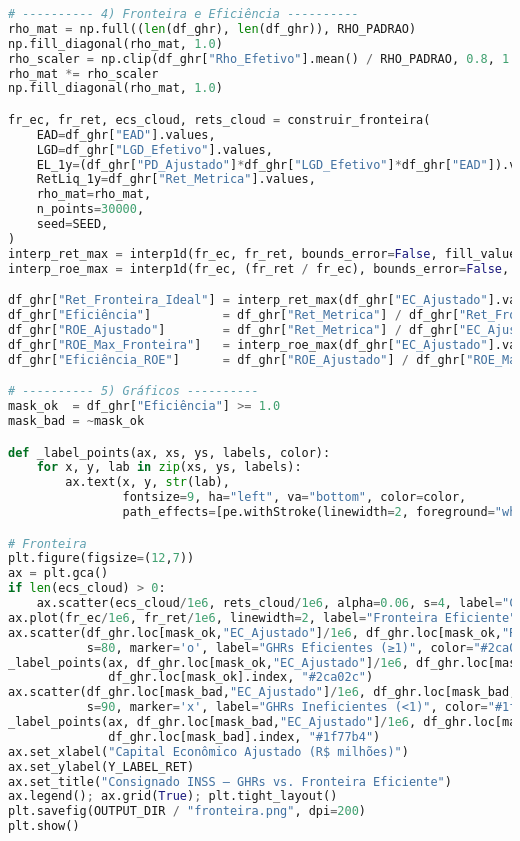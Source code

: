 \documentclass[11pt,a4paper]{article}
\newcommand{\1}{\mathbf{1}}
\begin{document}
\begin{lstlisting}[language=Python, caption={risk_frontier.py}]
# ---------- 4) Fronteira e Eficiência ----------
rho_mat = np.full((len(df_ghr), len(df_ghr)), RHO_PADRAO)
np.fill_diagonal(rho_mat, 1.0)
rho_scaler = np.clip(df_ghr["Rho_Efetivo"].mean() / RHO_PADRAO, 0.8, 1.5)
rho_mat *= rho_scaler
np.fill_diagonal(rho_mat, 1.0)

fr_ec, fr_ret, ecs_cloud, rets_cloud = construir_fronteira(
    EAD=df_ghr["EAD"].values,
    LGD=df_ghr["LGD_Efetivo"].values,
    EL_1y=(df_ghr["PD_Ajustado"]*df_ghr["LGD_Efetivo"]*df_ghr["EAD"]).values,
    RetLiq_1y=df_ghr["Ret_Metrica"].values,
    rho_mat=rho_mat,
    n_points=30000,
    seed=SEED,
)
interp_ret_max = interp1d(fr_ec, fr_ret, bounds_error=False, fill_value="extrapolate")
interp_roe_max = interp1d(fr_ec, (fr_ret / fr_ec), bounds_error=False, fill_value="extrapolate")

df_ghr["Ret_Fronteira_Ideal"] = interp_ret_max(df_ghr["EC_Ajustado"].values)
df_ghr["Eficiência"]          = df_ghr["Ret_Metrica"] / df_ghr["Ret_Fronteira_Ideal"]
df_ghr["ROE_Ajustado"]        = df_ghr["Ret_Metrica"] / df_ghr["EC_Ajustado"].replace(0, np.nan)
df_ghr["ROE_Max_Fronteira"]   = interp_roe_max(df_ghr["EC_Ajustado"].values)
df_ghr["Eficiência_ROE"]      = df_ghr["ROE_Ajustado"] / df_ghr["ROE_Max_Fronteira"]

# ---------- 5) Gráficos ----------
mask_ok  = df_ghr["Eficiência"] >= 1.0
mask_bad = ~mask_ok

def _label_points(ax, xs, ys, labels, color):
    for x, y, lab in zip(xs, ys, labels):
        ax.text(x, y, str(lab),
                fontsize=9, ha="left", va="bottom", color=color,
                path_effects=[pe.withStroke(linewidth=2, foreground="white")])

# Fronteira
plt.figure(figsize=(12,7))
ax = plt.gca()
if len(ecs_cloud) > 0:
    ax.scatter(ecs_cloud/1e6, rets_cloud/1e6, alpha=0.06, s=4, label="Carteiras Simuladas")
ax.plot(fr_ec/1e6, fr_ret/1e6, linewidth=2, label="Fronteira Eficiente")
ax.scatter(df_ghr.loc[mask_ok,"EC_Ajustado"]/1e6, df_ghr.loc[mask_ok,"Ret_Metrica"]/1e6,
           s=80, marker='o', label="GHRs Eficientes (≥1)", color="#2ca02c")
_label_points(ax, df_ghr.loc[mask_ok,"EC_Ajustado"]/1e6, df_ghr.loc[mask_ok,"Ret_Metrica"]/1e6,
              df_ghr.loc[mask_ok].index, "#2ca02c")
ax.scatter(df_ghr.loc[mask_bad,"EC_Ajustado"]/1e6, df_ghr.loc[mask_bad,"Ret_Metrica"]/1e6,
           s=90, marker='x', label="GHRs Ineficientes (<1)", color="#1f77b4")
_label_points(ax, df_ghr.loc[mask_bad,"EC_Ajustado"]/1e6, df_ghr.loc[mask_bad,"Ret_Metrica"]/1e6,
              df_ghr.loc[mask_bad].index, "#1f77b4")
ax.set_xlabel("Capital Econômico Ajustado (R$ milhões)")
ax.set_ylabel(Y_LABEL_RET)
ax.set_title("Consignado INSS – GHRs vs. Fronteira Eficiente")
ax.legend(); ax.grid(True); plt.tight_layout()
plt.savefig(OUTPUT_DIR / "fronteira.png", dpi=200)
plt.show()


\end{lstlisting}
\end{document}
